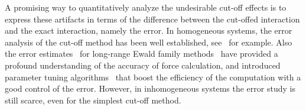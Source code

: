 \documentclass[aps,pre,preprint]{revtex4}
\begin{document}


A promising way to quantitatively analyze the undesirable cut-off
effects is to express these artifacts in terms of the difference
between the cut-offed interaction and the exact interaction, namely
the error. In homogeneous systems, the error analysis of the cut-off
method has been well established, see~\cite{kolafa1992cutoff} for
example. Also the error estimates~\cite{hummer1995numerical,
  kolafa1992cutoff, petersen1995accuracy, deserno1998mue2,
  wang2010optimizing} for long-range Ewald family
methods~\cite{ewald1921die, hockney1988computer, deserno1998mue1,
  darden1993pme, essmann1995spm} have provided a profound
understanding of the accuracy of force calculation, and introduced
parameter tuning algorithms~\cite{limbach06a, wang2010optimizing} that
boost the efficiency of the computation with a good control of the
error. However, in inhomogeneous systems the error study is still
scarce, even for the simplest cut-off method.
\end{document}
